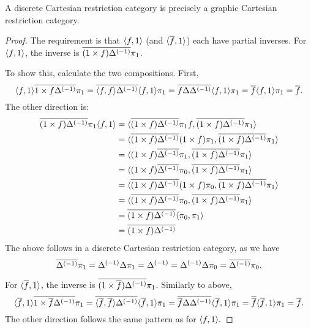 \begin{lemma}\label{lem:a_discrete_crc_is_precisely_a_graphic_crc}
  A discrete Cartesian restriction category is precisely a graphic Cartesian restriction category.
\end{lemma}
\begin{proof}
  The requirement is that $\langle f,1\rangle$ (and $\langle\overline{f},1\rangle$) each have partial inverses. For
  $\langle f,1\rangle$, the inverse is $\overline{(1 \times f){\Delta}^{(-1)}} \pi_1$.

  To show this, calculate  the two compositions. First,
  \[
    \<f,1\> \rst{1 \times f \inv{\Delta}} \pi_1 =
      \rst{\<f,f\> \inv{\Delta}}\<f,1\>\pi_1 %
    = \rst{f \Delta \inv{\Delta}}\<f,1\>\pi_1 %
    = \rst{f}\<f,1\>\pi_1 %
    = \rst{f}.%
  \]
  The other direction is:
  \begin{align*}
    \rst{(1 \times f)\inv{\Delta}} \pi_1 \<f,1\>
      &= \< \rst{(1 \times f)\inv{\Delta}} \pi_1 f ,
      \rst{(1 \times f)\inv{\Delta}}\pi_1 \>\\ %
    &= \< \rst{(1 \times f)\inv{\Delta}} (1 \times f) \pi_1,
      \rst{(1 \times f)\inv{\Delta}}\pi_1 \>\\ %
    &= \< (1 \times f )\rst{\inv{\Delta}} \pi_1 ,
      \rst{(1 \times f)\inv{\Delta}}\pi_1 \>\\ %
    &= \< (1 \times f) \rst{\inv{\Delta}} \pi_0 ,
      \rst{(1 \times f)\inv{\Delta}}\pi_1 \>\\ %
    &= \< \rst{(1 \times f)\inv{\Delta}} (1 \times f) \pi_0,
      \rst{(1 \times f)\inv{\Delta}}\pi_1 \>\\ %
    &= \< \rst{(1 \times f)\inv{\Delta}} \pi_0,
      \rst{(1 \times f)\inv{\Delta}}\pi_1 \>\\ %
    &= \rst{(1 \times f)\inv{\Delta}} \< \pi_0, \pi_1 \>\\ %
    &= \rst{(1 \times f)\inv{\Delta}}
  \end{align*}
  The above follows in a discrete Cartesian restriction category, as we have
  \begin{equation*}
    \overline{{\Delta}^{(-1)}} \pi_1 = {\Delta}^{(-1)} \Delta \pi_1 = {\Delta}^{(-1)} = {\Delta}^{(-1)} \Delta \pi_0 = \overline{{\Delta}^{(-1)}} \pi_0.
  \end{equation*}

  For $\langle\overline{f},1\rangle$, the inverse is $\overline{(1 \times \overline{f}){\Delta}^{(-1)}} \pi_1$. Similarly
  to above,
  \[
    \<\rst{f},1\> \rst{1 \times \rst{f} \inv{\Delta}} \pi_1 =
      \rst{\<\rst{f},\rst{f}\> \inv{\Delta}}\<\rst{f},1\>\pi_1 %
    = \rst{\rst{f} \Delta \inv{\Delta}}\<\rst{f},1\>\pi_1 %
    = \rst{\rst{f}}\<\rst{f},1\>\pi_1 %
    = \rst{f}.%
  \]
  The other direction follows the same pattern as for $\langle f,1\rangle.$
\end{proof}

